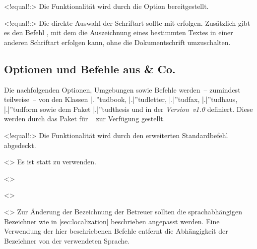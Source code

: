 \begin{DeclareEntity}{}
\begin{NoIndexDefault}
\begin{Declaration}
  {}
  <!equal!:>
\printdeclarationlist
%
Die Funktionalität wird durch die Option  bereitgestellt.
\end{Declaration}

\begin{Declaration}
  {}
  <!equal!:>
\printdeclarationlist
%
Die direkte Auswahl der Schriftart sollte mit  erfolgen. 
Zusätzlich gibt es den Befehl , mit dem die Auszeichnung 
eines bestimmten Textes in einer anderen Schriftart erfolgen kann, ohne die 
Dokumentschrift umzuschalten.
\end{Declaration}
%



\subsection{Optionen und Befehle aus  \& Co.}
%
Die nachfolgenden Optionen, Umgebungen sowie Befehle werden~-- zumindest 
teilweise~-- von den Klassen \Class|.|''{tudbook}, \Class|.|''{tudletter}, 
\Class|.|''{tudfax}, \Class|.|''{tudhaus}, \Class|.|''{tudform} sowie dem Paket 
\Package|.|''{tudthesis} und \TUDScript in der \emph{Version~v1.0} definiert. 
Diese werden durch das Paket  für \TUDScript~\vTUDScript{} 
zur Verfügung gestellt.

\begin{Declaration}
  {}
  <!equal!:>
\printdeclarationlist
%
Die Funktionalität wird durch den erweiterten Standardbefehl  
abgedeckt.
\end{Declaration}

\begin{Declaration}
  {}
  <>
\printdeclarationlist
%
Es ist 
statt  zu verwenden.
\end{Declaration}

\begin{Declaration}
  {}
  <>
\begin{Declaration}
  {}
  <>
\begin{Declaration}
  {}
  <>
\printdeclarationlist
%
Zur Änderung der Bezeichnung der Betreuer sollten die sprachabhängigen 
Bezeichner wie in \autoref{sec:localization} beschrieben angepasst werden. Eine 
Verwendung der hier beschriebenen Befehle entfernt die Abhängigkeit der 
Bezeichner von der verwendeten Sprache.
\end{Declaration}
\end{Declaration}
\end{Declaration}


\end{NoIndexDefault}
\end{DeclareEntity}
